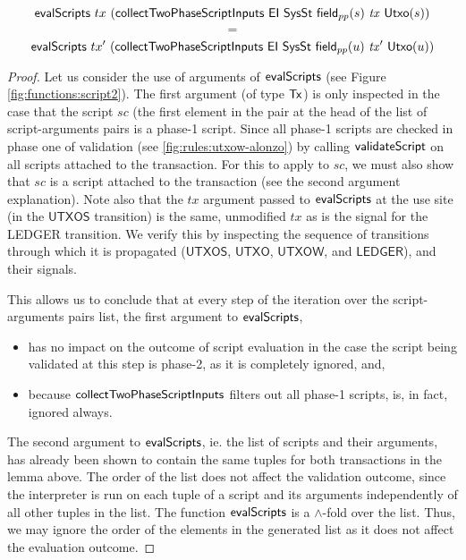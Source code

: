 \begin{property}
\begin{corollary}
  \[\mathsf{evalScripts}~{tx}~ (\mathsf{collectTwoPhaseScriptInputs}~\mathsf{EI}~\mathsf{SysSt} ~\mathsf{field}_{pp}(s)~\mathit{tx}~ \mathsf{Utxo}(s))\]
  \[ = \]
  \[\mathsf{evalScripts}~{tx'}~ (\mathsf{collectTwoPhaseScriptInputs}~\mathsf{EI}~\mathsf{SysSt} ~\mathsf{field}_{pp}(u)~\mathit{tx'}~ \mathsf{Utxo}(u))\]

\end{corollary}

\begin{proof}
  Let us consider the use of arguments of $\mathsf{evalScripts}$ (see Figure \ref{fig:functions:script2}).
  The first argument (of type $\mathsf{Tx}$) is only inspected in the case that the script $sc$ (the first element
    in the pair at the head of the list of script-arguments pairs is a phase-1 script. Since all phase-1 scripts
    are checked in phase one of validation (see \ref{fig:rules:utxow-alonzo}) by calling $\mathsf{validateScript}$
    on all scripts attached to the transaction. For this to apply to $sc$, we must also show
    that $sc$ is a script attached to the transaction (see the second argument explanation).
    Note also that the $tx$ argument passed to $\mathsf{evalScripts}$ at the use site (in the $\mathsf{UTXOS}$ transition)
    is the same, unmodified $tx$ as is the signal for the LEDGER transition. We verify this by inspecting
    the sequence of transitions through which it is propagated
    ($\mathsf{UTXOS}$, $\mathsf{UTXO}$, $\mathsf{UTXOW}$, and $\mathsf{LEDGER}$), and their signals.

    This allows us to conclude that at every step of the iteration over the script-arguments pairs list,
    the first argument to $\mathsf{evalScripts}$,

    \begin{itemize}
      \item has no impact on the outcome of script evaluation in the case the script
      being validated at this step is phase-2, as it is completely ignored, and,

      \item because $\mathsf{collectTwoPhaseScriptInputs}$ filters out all phase-1 scripts,
      is, in fact, ignored always.
    \end{itemize}

    The second argument to $\mathsf{evalScripts}$, ie. the list of scripts and their arguments,
    has already been shown to contain the same tuples for both transactions in the lemma above.
    The order of the list does not affect the validation outcome, since the interpreter is run
    on each tuple of a script and its arguments independently of all other tuples in the list.
    The function $\mathsf{evalScripts}$ is a $\wedge$-fold over the list. Thus, we may ignore the order
    of the elements in the generated list as it does not affect the evaluation outcome.


\end{proof}
\end{property}
